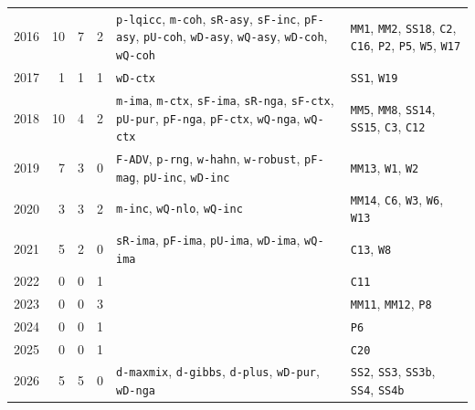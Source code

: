 \begin{longtable}{@{}lrrrp{3.4cm}p{5.6cm}@{}}
2016 & 10 & 7 & 2 & \texttt{p-lqicc}, \texttt{m-coh}, \texttt{sR-asy}, \texttt{sF-inc}, \texttt{pF-asy}, \texttt{pU-coh}, \texttt{wD-asy}, \texttt{wQ-asy}, \texttt{wD-coh}, \texttt{wQ-coh} & \texttt{MM1}, \texttt{MM2}, \texttt{SS18}, \texttt{C2}, \texttt{C16}, \texttt{P2}, \texttt{P5}, \texttt{W5}, \texttt{W17} \\
2017 & 1 & 1 & 1 & \texttt{wD-ctx} & \texttt{SS1}, \texttt{W19} \\
2018 & 10 & 4 & 2 & \texttt{m-ima}, \texttt{m-ctx}, \texttt{sF-ima}, \texttt{sR-nga}, \texttt{sF-ctx}, \texttt{pU-pur}, \texttt{pF-nga}, \texttt{pF-ctx}, \texttt{wQ-nga}, \texttt{wQ-ctx} & \texttt{MM5}, \texttt{MM8}, \texttt{SS14}, \texttt{SS15}, \texttt{C3}, \texttt{C12} \\
2019 & 7 & 3 & 0 & \texttt{F-ADV}, \texttt{p-rng}, \texttt{w-hahn}, \texttt{w-robust}, \texttt{pF-mag}, \texttt{pU-inc}, \texttt{wD-inc} & \texttt{MM13}, \texttt{W1}, \texttt{W2} \\
2020 & 3 & 3 & 2 & \texttt{m-inc}, \texttt{wQ-nlo}, \texttt{wQ-inc} & \texttt{MM14}, \texttt{C6}, \texttt{W3}, \texttt{W6}, \texttt{W13} \\
2021 & 5 & 2 & 0 & \texttt{sR-ima}, \texttt{pF-ima}, \texttt{pU-ima}, \texttt{wD-ima}, \texttt{wQ-ima} & \texttt{C13}, \texttt{W8} \\
2022 & 0 & 0 & 1 &  & \texttt{C11} \\
2023 & 0 & 0 & 3 &  & \texttt{MM11}, \texttt{MM12}, \texttt{P8} \\
2024 & 0 & 0 & 1 &  & \texttt{P6} \\
2025 & 0 & 0 & 1 &  & \texttt{C20} \\
2026 & 5 & 5 & 0 & \texttt{d-maxmix}, \texttt{d-gibbs}, \texttt{d-plus}, \texttt{wD-pur}, \texttt{wD-nga} & \texttt{SS2}, \texttt{SS3}, \texttt{SS3b}, \texttt{SS4}, \texttt{SS4b} \\
\bottomrule\end{longtable}

